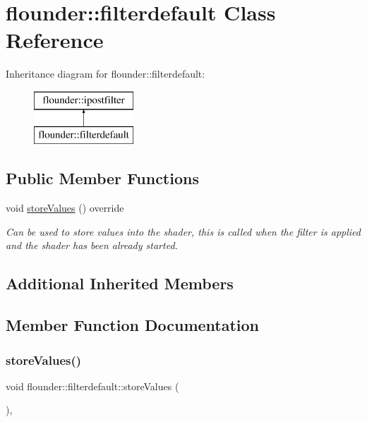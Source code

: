 \hypertarget{classflounder_1_1filterdefault}{}\section{flounder\+:\+:filterdefault Class Reference}
\label{classflounder_1_1filterdefault}
Inheritance diagram for flounder\+:\+:filterdefault\+:\begin{figure}[H]
\begin{center}
\leavevmode
\includegraphics[height=2.000000cm]{classflounder_1_1filterdefault}
\end{center}
\end{figure}
\subsection*{Public Member Functions}
\begin{DoxyCompactItemize}
\item 
void \hyperlink{classflounder_1_1filterdefault_a9e858528a7d3356b94e16f10928a1d72}{store\+Values} () override
\begin{DoxyCompactList}\small\item\em Can be used to store values into the shader, this is called when the filter is applied and the shader has been already started. \end{DoxyCompactList}\end{DoxyCompactItemize}
\subsection*{Additional Inherited Members}


\subsection{Member Function Documentation}
\mbox{\label{classflounder_1_1filterdefault_a9e858528a7d3356b94e16f10928a1d72}} 
\subsubsection{\texorpdfstring{store\+Values()}{storeValues()}}
{\footnotesize\ttfamily void flounder\+::filterdefault\+::store\+Values (\begin{DoxyParamCaption}{ }\end{DoxyParamCaption})\hspace{0.3cm}{\ttfamily [override]}, {\ttfamily [virtual]}}



